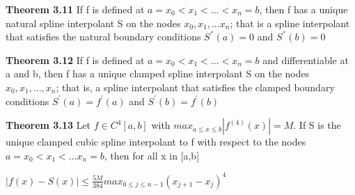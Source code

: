 \documentclass{article}
\begin{document}
\textbf {Theorem 3.11} If f is defined at $a = x_0 < x_1 < \dots < x_n = b$, then f has a unique natural spline interpolant S on the nodes $x_0, x_1, \dots x_n$; that is a spline interpolant that satisfies the natural boundary conditions $S^{''}(a) = 0$ and $S^{''}(b) = 0$

\textbf {Theorem 3.12} If f is defined at $a = x_0 < x_1 < \dots < x_n = b$ and differentiable at a and b, then f has a unique clamped spline interpolant S on the nodes $x_0, x_1,...,x_n$; that is, a spline interpolant that satisfies the clamped boundary conditions $S^{'}(a) = f^{'}(a)$ and $S^{'}(b) = f^{'}(b)$

\textbf {Theorem 3.13} Let $f \in C^4[a,b]$ with $max_{a \leq x \leq b}|f^{(4)}(x)| = M$. If S is the unique clamped cubic spline interpolant to f with respect to the nodes $a = x_0 < x_1 < \dots x_n = b$, then for all x in [a,b]
\begin{center}
$|f(x) - S(x)| \leq \frac{5M}{384} max_{0 \leq j \leq n-1}{(x_{j+1} - x_j)}^4$
\end{center}
\end{document}
